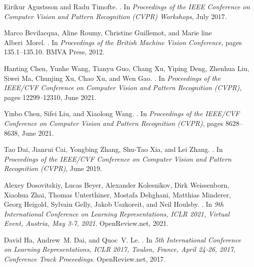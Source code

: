 \documentclass[10pt,twocolumn,letterpaper]{article}
\begin{document}
{\small

\begin{thebibliography}{10}\itemsep=-1pt

Eirikur Agustsson and Radu Timofte.
.
\newblock In {\em Proceedings of the IEEE Conference on Computer Vision and
  Pattern Recognition (CVPR) Workshops}, July 2017.

Marco Bevilacqua, Aline Roumy, Christine Guillemot, and Marie line
  Alberi~Morel.
.
\newblock In {\em Proceedings of the British Machine Vision Conference}, pages
  135.1--135.10. BMVA Press, 2012.

Hanting Chen, Yunhe Wang, Tianyu Guo, Chang Xu, Yiping Deng, Zhenhua Liu, Siwei
  Ma, Chunjing Xu, Chao Xu, and Wen Gao.
.
\newblock In {\em Proceedings of the IEEE/CVF Conference on Computer Vision and
  Pattern Recognition (CVPR)}, pages 12299--12310, June 2021.

Yinbo Chen, Sifei Liu, and Xiaolong Wang.
.
\newblock In {\em Proceedings of the IEEE/CVF Conference on Computer Vision and
  Pattern Recognition (CVPR)}, pages 8628--8638, June 2021.

Tao Dai, Jianrui Cai, Yongbing Zhang, Shu-Tao Xia, and Lei Zhang.
.
\newblock In {\em Proceedings of the IEEE/CVF Conference on Computer Vision and
  Pattern Recognition (CVPR)}, June 2019.

Alexey Dosovitskiy, Lucas Beyer, Alexander Kolesnikov, Dirk Weissenborn,
  Xiaohua Zhai, Thomas Unterthiner, Mostafa Dehghani, Matthias Minderer, Georg
  Heigold, Sylvain Gelly, Jakob Uszkoreit, and Neil Houlsby.
.
\newblock In {\em 9th International Conference on Learning Representations,
  {ICLR} 2021, Virtual Event, Austria, May 3-7, 2021}. OpenReview.net, 2021.

David Ha, Andrew~M. Dai, and Quoc~V. Le.
.
\newblock In {\em 5th International Conference on Learning Representations,
  {ICLR} 2017, Toulon, France, April 24-26, 2017, Conference Track
  Proceedings}. OpenReview.net, 2017.


\end{thebibliography}}
\end{document}
